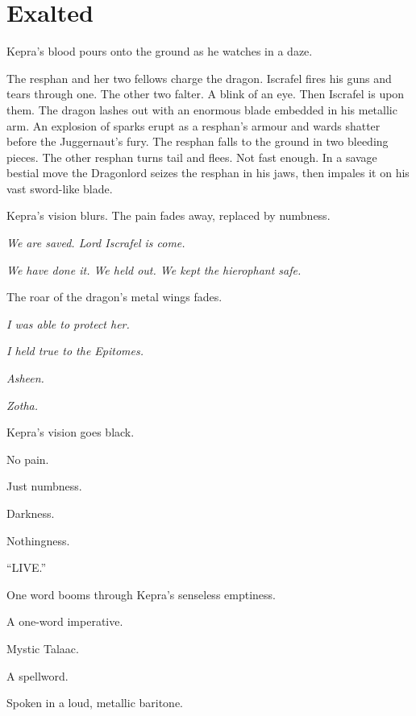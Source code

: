 \documentclass
  [a4paper,
   12pt,
   oneside
  ]%
  {article}
\newcommand{\sectionbreak}{\bigskip\noindent}
\begin{document}
\section{Exalted}
Kepra’s blood pours onto the ground as he watches in a daze.

The resphan and her two fellows charge the dragon. 
Iscrafel fires his guns and tears through one. 
The other two falter.
A blink of an eye.
Then Iscrafel is upon them. 
The dragon lashes out with an enormous blade embedded in his metallic arm. 
An explosion of sparks erupt as a resphan’s armour and wards shatter before the Juggernaut’s fury. 
The resphan falls to the ground in two bleeding pieces. 
The other resphan turns tail and flees. 
Not fast enough. 
In a savage bestial move the Dragonlord seizes the resphan in his jaws, then impales it on his vast sword-like blade. 

Kepra’s vision blurs. 
The pain fades away, replaced by numbness.

\emph{We are saved. Lord Iscrafel is come.}

\emph{We have done it. We held out. We kept the hierophant safe.}

The roar of the dragon’s metal wings fades. 

\emph{I was able to protect her.}

\emph{I held true to the Epitomes.}

\emph{Asheen.}

\emph{Zotha.}

Kepra’s vision goes black. 

No pain. 

Just numbness. 

Darkness.

Nothingness.



\sectionbreak
{\Large{``{LIVE.}''}}


\sectionbreak
One word booms through Kepra’s senseless emptiness. 

A one-word imperative.

Mystic Talaac.

A spellword.

Spoken in a loud, metallic baritone. 
\end{document}
